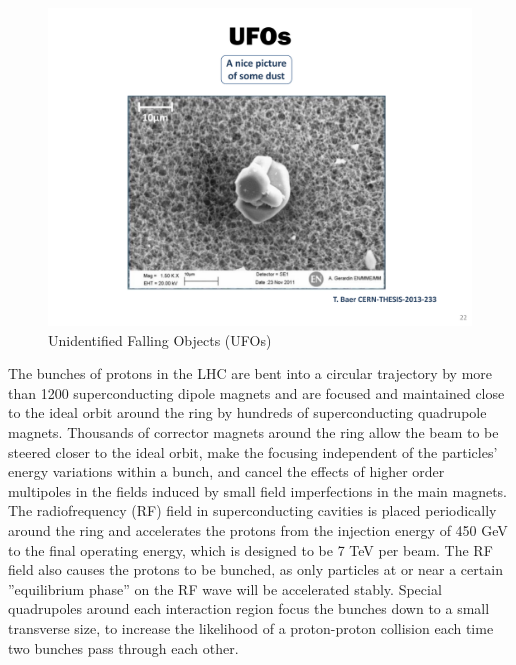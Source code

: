 \begin{figure}
\begin{center}
\includegraphics[width=.75\textwidth]{pics/dust}
\caption{Unidentified Falling Objects (UFOs)}
\end{center}
\end{figure}




The bunches of protons in the LHC are bent into a circular trajectory by more than 1200
 superconducting dipole magnets and are focused and maintained close to the ideal
 orbit around the ring by hundreds of superconducting quadrupole magnets. 
Thousands of corrector magnets around the ring allow the beam to be steered closer 
to the ideal orbit, make the focusing independent of the particles’ energy variations
 within a bunch, and cancel the effects of higher order multipoles in the fields induced 
by small field imperfections in the main magnets. 
The radiofrequency (RF) field in superconducting cavities is placed periodically around 
the ring and accelerates the protons from the injection energy of 450 GeV to the final
 operating energy, which is designed to be 7 TeV per beam. The RF field also causes the
 protons to be bunched, as only particles at or near a certain ”equilibrium phase” on 
the RF wave will be accelerated stably. Special quadrupoles around each interaction region
 focus the bunches down to a small transverse size, to increase the likelihood of a
 proton-proton collision each time two bunches pass through each other.
